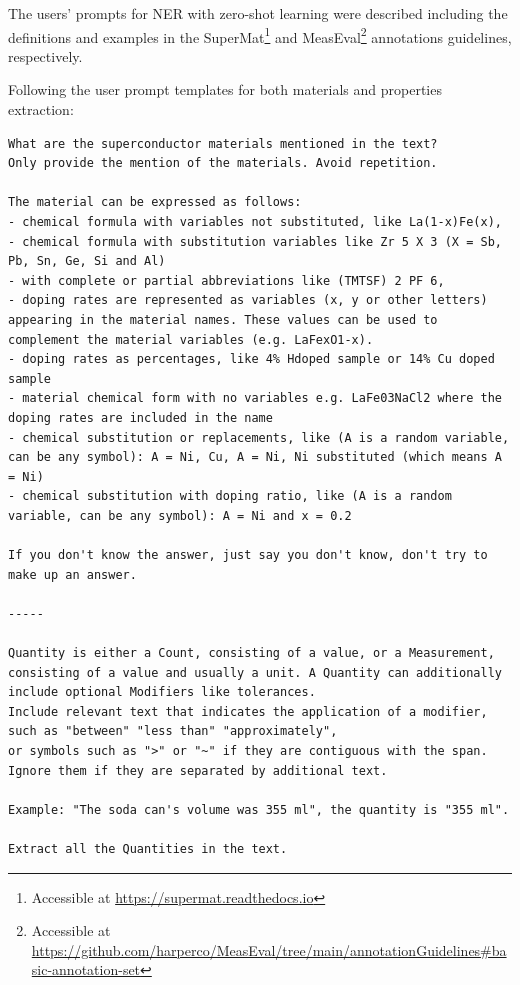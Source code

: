 \documentclass[a4paper]{article}
\begin{document}
The users' prompts for NER with zero-shot learning were described including the definitions and examples in the SuperMat\footnote{Accessible at \url{https://supermat.readthedocs.io}} and MeasEval\footnote{Accessible at \url{https://github.com/harperco/MeasEval/tree/main/annotationGuidelines\#basic-annotation-set}} annotations guidelines, respectively.  


Following the user prompt templates for both materials and properties extraction: 

\begin{lstlisting}[caption=User prompt designed for extracting materials and properties]
What are the superconductor materials mentioned in the text? 
Only provide the mention of the materials. Avoid repetition. 

The material can be expressed as follows:
- chemical formula with variables not substituted, like La(1-x)Fe(x),
- chemical formula with substitution variables like Zr 5 X 3 (X = Sb, Pb, Sn, Ge, Si and Al)
- with complete or partial abbreviations like (TMTSF) 2 PF 6,
- doping rates are represented as variables (x, y or other letters) appearing in the material names. These values can be used to complement the material variables (e.g. LaFexO1-x).
- doping rates as percentages, like 4% Hdoped sample or 14% Cu doped sample
- material chemical form with no variables e.g. LaFe03NaCl2 where the doping rates are included in the name
- chemical substitution or replacements, like (A is a random variable, can be any symbol): A = Ni, Cu, A = Ni, Ni substituted (which means A = Ni)
- chemical substitution with doping ratio, like (A is a random variable, can be any symbol): A = Ni and x = 0.2

If you don't know the answer, just say you don't know, don't try to make up an answer.

-----

Quantity is either a Count, consisting of a value, or a Measurement, 
consisting of a value and usually a unit. A Quantity can additionally include optional Modifiers like tolerances.
Include relevant text that indicates the application of a modifier, such as "between" "less than" "approximately", 
or symbols such as ">" or "~" if they are contiguous with the span. Ignore them if they are separated by additional text.
 
Example: "The soda can's volume was 355 ml", the quantity is "355 ml".

Extract all the Quantities in the text.
\end{lstlisting}
\end{document}
